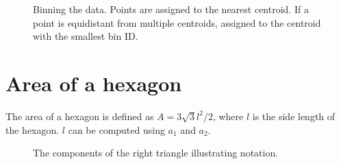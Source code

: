 \documentclass[
  12pt]{article}
\begin{document}
\begin{figure}[H]


\caption{\label{fig-assign-data}Binning the data. Points are assigned to
the nearest centroid. If a point is equidistant from multiple centroids,
assigned to the centroid with the smallest bin ID.}

\end{figure}%

\section{Area of a hexagon}\label{area-of-a-hexagon}

The area of a hexagon is defined as \(A = 3\sqrt{3}l^2/2\), where \(l\)
is the side length of the hexagon. \(l\) can be computed using \(a_1\)
and \(a_2\).

\begin{figure}[H]


\caption{\label{fig-tri-param}The components of the right triangle
illustrating notation.}

\end{figure}%
\end{document}
